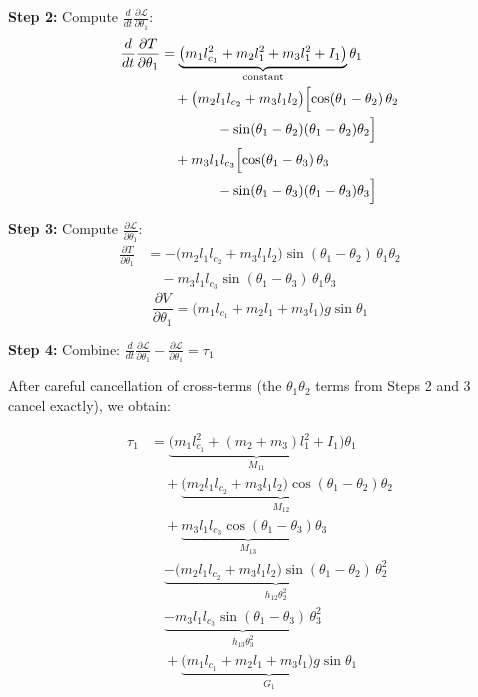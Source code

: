 \documentclass[11pt,a4paper]{article}
\newcommand{\dt}[1]{\dot{#1}}
\newcommand{\ddt}[1]{\ddot{#1}}
\newcommand{\pder}[2]{\frac{\partial #1}{\partial #2}}
\def\dt#1{#1}%
\def\ddt#1{#1}%
\begin{document}
\textbf{Step 2:} Compute $\frac{d}{dt}\pder{\mathcal{L}}{\dt{\theta}_1}$:
\begin{align}
    \frac{d}{dt}\pder{T}{\dt{\theta}_1} &= \underbrace{\bigl(m_1 l_{c_1}^2 + m_2 l_1^2 + m_3 l_1^2 + I_1\bigr)}_{\text{constant}} \ddt{\theta}_1 \nonumber \\
    &\quad + \bigl(m_2 l_1 l_{c_2} + m_3 l_1 l_2\bigr) \Bigl[
        \cos(\theta_1 - \theta_2) \, \ddt{\theta}_2 \nonumber \\
    &\qquad\qquad - \sin(\theta_1 - \theta_2)(\dt{\theta}_1 - \dt{\theta}_2) \dt{\theta}_2
    \Bigr] \nonumber \\
    &\quad + m_3 l_1 l_{c_3} \Bigl[
        \cos(\theta_1 - \theta_3) \, \ddt{\theta}_3 \nonumber \\
    &\qquad\qquad - \sin(\theta_1 - \theta_3)(\dt{\theta}_1 - \dt{\theta}_3) \dt{\theta}_3
    \Bigr]
    \label{eq:ddt_dTddtheta1}
\end{align}

\textbf{Step 3:} Compute $\pder{\mathcal{L}}{\theta_1}$:
\begin{align}
    \pder{T}{\theta_1} &= -\bigl(m_2 l_1 l_{c_2} + m_3 l_1 l_2\bigr) \sin(\theta_1 - \theta_2) \, \dt{\theta}_1 \dt{\theta}_2 \nonumber \\
    &\quad - m_3 l_1 l_{c_3} \sin(\theta_1 - \theta_3) \, \dt{\theta}_1 \dt{\theta}_3
    \label{eq:dTdtheta1}
\end{align}
\begin{equation}
    \pder{V}{\theta_1} = \bigl(m_1 l_{c_1} + m_2 l_1 + m_3 l_1\bigr) g \sin\theta_1
    \label{eq:dVdtheta1}
\end{equation}

\textbf{Step 4:} Combine: $\frac{d}{dt}\pder{\mathcal{L}}{\dt{\theta}_1} - \pder{\mathcal{L}}{\theta_1} = \tau_1$

After careful cancellation of cross-terms (the $\dt{\theta}_1\dt{\theta}_2$ terms
from Steps 2 and 3 cancel exactly), we obtain:

\begin{align}
    \tau_1 &= \underbrace{\bigl(m_1 l_{c_1}^2 + (m_2+m_3) l_1^2 + I_1\bigr)}_{M_{11}} \ddt{\theta}_1 \nonumber \\
    &\quad + \underbrace{\bigl(m_2 l_1 l_{c_2} + m_3 l_1 l_2\bigr) \cos(\theta_1 - \theta_2)}_{M_{12}} \ddt{\theta}_2 \nonumber \\
    &\quad + \underbrace{m_3 l_1 l_{c_3} \cos(\theta_1 - \theta_3)}_{M_{13}} \ddt{\theta}_3 \nonumber \\
    &\quad \underbrace{- \bigl(m_2 l_1 l_{c_2} + m_3 l_1 l_2\bigr) \sin(\theta_1 - \theta_2) \, \dt{\theta}_2^2}_{h_{12} \dt{\theta}_2^2} \nonumber \\
    &\quad \underbrace{- m_3 l_1 l_{c_3} \sin(\theta_1 - \theta_3) \, \dt{\theta}_3^2}_{h_{13} \dt{\theta}_3^2} \nonumber \\
    &\quad + \underbrace{\bigl(m_1 l_{c_1} + m_2 l_1 + m_3 l_1\bigr) g \sin\theta_1}_{G_1}
    \label{eq:eom1_expanded}
\end{align}
\end{document}
